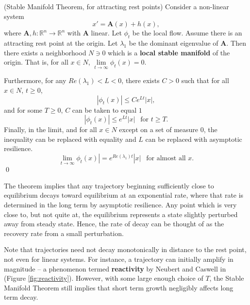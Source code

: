 \begin{theorem}(Stable Manifold Theorem, for attracting rest points)
	Consider a non-linear system 
	$$x' = \mathbf{A}(x) + h(x),$$ 
	where $\mathbf{A}, h: \mathbb{R}^n \to \mathbb{R}^n$ with $\mathbf{A}$ linear.  Let $\phi_t$ be the local flow.
	Assume there is an attracting rest point at the origin. 
	Let $\lambda_1$ be the dominant eigenvalue of $\mathbf{A}$. Then there exists a neighborhood $N \ni 0$ which is a \textbf{local stable manifold} of the origin. 
	That is, for all $x \in N$, $\lim\limits_{t \to \infty} \phi_t(x)= 0$.
	
	Furthermore, for any $Re(\lambda_1) < L < 0$, there exists $C >0$ such that for all $x \in N$, $t \geq 0$,
	$$|\phi_t(x)| \leq Ce^{Lt}|x|,$$
 	and for some $T \geq 0$, $C$ can be taken to equal $1$
	$$|\phi_t(x)| \leq e^{L t}|x| ~ ~\text{ for } t \geq T.$$
	Finally, in the limit, and for all $x\in N$ except on a set of measure 0, the inequality can be replaced with equality and $L$ can be replaced with asymptotic resilience.
	$$\lim\limits_{t \to \infty} \phi_t(x)| = e^{Re(\lambda_1) t}|x| ~ ~\text{ for almost all } x.$$ 
	\qed
\end{theorem}


The theorem implies that any trajectory beginning sufficiently close to equilibrium decays toward equilibrium at an exponential rate, where that rate is determined in the long term by asymptotic resilience. Any point which is very close to, but not quite at, the equilibrium represents a state slightly perturbed away from steady state. Hence, the rate of decay can be thought of as the recovery rate from a small perturbation. 


\begin{remark}
	Note that trajectories need not decay monotonically in distance to the rest point, not even for linear systems. For instance, a trajectory can initially amplify in magnitude -- a phenomenon termed \textbf{reactivity} by Neubert and Caswell in \cite{neubertAlternativesResilienceMeasuring1997a} (Figure \ref{fig:reactivity}). However, with some large enough choice of $T$, the Stable Manifold Theorem still implies that short term growth negligibly affects long term decay. 
\end{remark}

